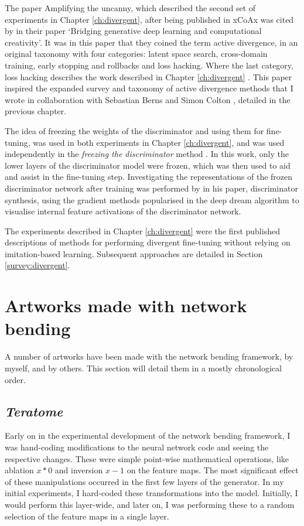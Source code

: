 The paper Amplifying the uncanny, which described the second set of experiments in Chapter \ref{ch:divergent}, after being published in xCoAx was cited by \cite{berns2020bridging} in their paper ‘Bridging generative deep learning and computational creativity’. 
It was in this paper that they coined the term active divergence, in an original taxonomy with four categories: latent space search, cross-domain training, early stopping and rollbacks and loss hacking. 
Where the last category, loss hacking describes the work described in Chapter \ref{ch:divergent} . 
This paper inspired the expanded survey and taxonomy of active divergence methods that I wrote in collaboration with Sebastian Berns and Simon Colton \citep{broad2021active}, detailed in the previous chapter.

The idea of freezing the weights of the discriminator and using them for fine-tuning, was used in both experiments in Chapter \ref{ch:divergent}, and was used independently in the \textit{freezing the discriminator} method \citep{mo2020freeze}. In this work, only the lower layers of the discriminator model were frozen, which was then used to aid and assist in the fine-tuning step.
Investigating the representations of the frozen discriminator network after training was performed by \citet{porres2021discriminator} in his paper, discriminator synthesis, using the gradient methods popularised in the deep dream algorithm to visualise internal feature activations of the discriminator network.

The experiments described in Chapter \ref{ch:divergent} were the first published descriptions of methods for performing divergent fine-tuning without relying on imitation-based learning. 
Subsequent approaches are detailed in Section \ref{survey:divergent}.

\section{Artworks made with network bending}
\label{c7:sec:net-bend-artworks}

A number of artworks have been made with the network bending framework, by myself, and by others. 
This section will detail them in a mostly chronological order.

\subsection{\textit{Teratome}}
\label{c7:subsubsec:teratome}

Early on in the experimental development of the network bending framework, I was hand-coding modifications to the neural network code and seeing the respective changes. 
These were simple point-wise mathematical operations, like ablation $x*0$ and inversion $x-1$ on the feature maps. 
The most significant effect of these manipulations occurred in the first few layers of the generator. 
In my initial experiments, I hard-coded these transformations into the model. Initially, I would perform this layer-wide, and later on, I was performing these to a random selection of the feature maps in a single layer. 


